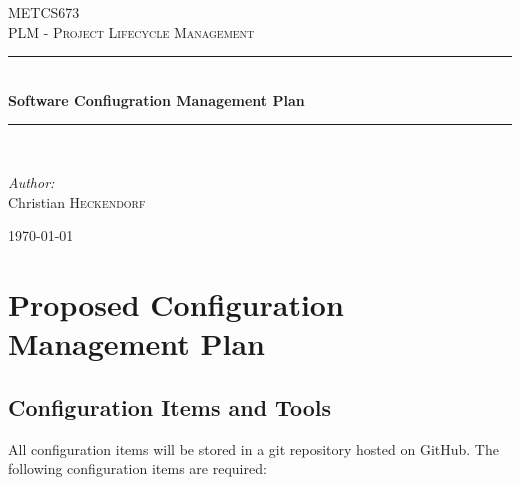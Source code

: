 \documentclass{article}
\newcommand{\HRule}{\rule{\linewidth}{0.5mm}}
\begin{document}
	\begin{titlepage}
		\begin{center}
			\textsc{\LARGE METCS673}\\[1.5cm]
			\textsc{\Large PLM - Project Lifecycle Management}\\[0.5cm]
			\HRule \\[0.4cm]
			{ \huge \bfseries Software Confiugration Management Plan \\[0.4cm] }
			\HRule \\[1.5cm]

			\begin{minipage}{0.4\textwidth}
			\begin{flushleft} \large
			\emph{Author:}\\
			Christian \textsc{Heckendorf}
			\end{flushleft}
			\end{minipage}

			\vfill

			{\large \today}
		\end{center}
	\end{titlepage}

	\section{Proposed Configuration Management Plan}

	\subsection{Configuration Items and Tools}

	All configuration items will be stored in a git repository hosted on GitHub. The following configuration items are required:
\end{document}
